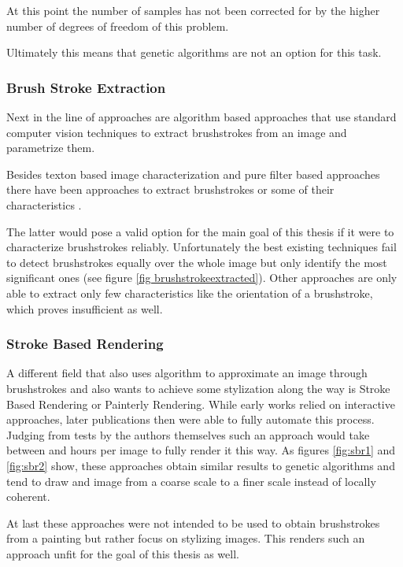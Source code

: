 At this point the number of samples has not been corrected for by the higher number of degrees of freedom of this problem.

Ultimately this means that genetic algorithms are not an option for this task.

\subsubsection{Brush Stroke Extraction}
Next in the line of approaches are algorithm based approaches that use standard computer vision techniques to extract brushstrokes from an image and parametrize them.

Besides texton based image characterization \cite{textons} and pure filter based approaches \cite{filters} there have been approaches to extract brushstrokes or some of their characteristics \cite{brushstrokecharacteristics} \cite{brushstrokeextraction}.

The latter would pose a valid option for the main goal of this thesis if it were to characterize brushstrokes reliably.
Unfortunately the best existing techniques fail to detect brushstrokes equally  over the whole image but only identify the most significant ones (see figure \ref{fig brushstrokeextracted}).
Other approaches are only able to extract only few characteristics like the orientation of a brushstroke, which proves insufficient as well.

\subsubsection{Stroke Based Rendering}
A different field that also uses algorithm to approximate an image through brushstrokes and also wants to achieve some stylization along the way is Stroke Based Rendering or Painterly Rendering.
While early works relied on interactive approaches, later publications then were able to fully automate this process.
Judging from tests by the authors themselves such an approach would take between  and  hours per image to fully render it this way.
As figures \ref{fig:sbr1} and \ref{fig:sbr2} show, these approaches obtain similar results to genetic algorithms and tend to draw and image from a coarse scale to a finer scale instead of locally coherent.

At last these approaches were not intended to be used to obtain brushstrokes from a painting but rather focus on stylizing images.
This renders such an approach unfit for the goal of this thesis as well.

